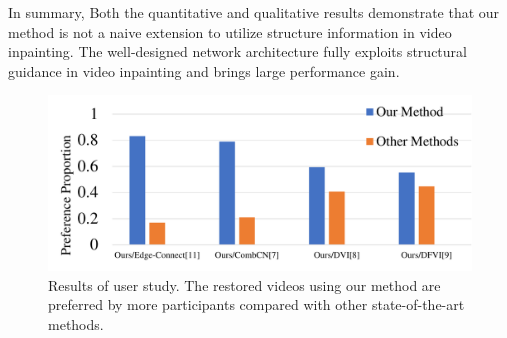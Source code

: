 In summary, Both the quantitative and qualitative results demonstrate that our method is not a naive extension to utilize structure information in video inpainting.
The well-designed network architecture fully exploits structural guidance in video inpainting and brings large performance gain.





\begin{figure}[!t]
	\centering
	\includegraphics[width=1.0\columnwidth]{userstudy} %
	\caption{Results of user study. The restored videos using our method are preferred by more participants compared with other state-of-the-art methods. }
	\label{userstudy}
\end{figure}






